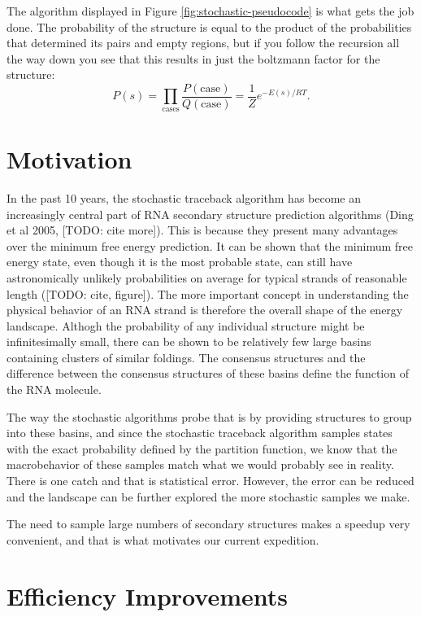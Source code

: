 The algorithm displayed in Figure \ref{fig:stochastic-pseudocode} is
what gets the job done. The probability of the structure is equal to
the product of the probabilities that determined its pairs and empty
regions, but if you follow the recursion all the way down you see that
this results in just the boltzmann factor for the structure:
\begin{equation}
P(s) = \prod_{\text{cases}} \frac{P(\text{case})}{Q(\text{case})} =
\frac{1}{Z} e^{-E(s)/RT}.
\end{equation}

\section{Motivation}

In the past 10 years, the stochastic traceback algorithm has become an
increasingly central part of RNA secondary structure prediction
algorithms (Ding et al 2005, [TODO: cite more]). This is because they
present many advantages over the minimum free energy prediction. It
can be shown that the minimum free energy state, even though it is the
most probable state, can still have astronomically unlikely
probabilities on average for typical strands of reasonable length
([TODO: cite, figure]). The more important concept in understanding
the physical behavior of an RNA strand is therefore the overall shape
of the energy landscape. Althogh the probability of any individual
structure might be infinitesimally small, there can be shown to be
relatively few large basins containing clusters of similar foldings.
The consensus structures and the difference between the consensus
structures of these basins define the function of the RNA molecule.

The way the stochastic algorithms probe that is by providing
structures to group into these basins, and since the stochastic
traceback algorithm samples states with the exact probability defined
by the partition function, we know that the macrobehavior of these
samples match what we would probably see in reality. There is one
catch and that is statistical error. However, the error can be reduced
and the landscape can be further explored the more stochastic samples
we make.

The need to sample large numbers of secondary structures makes a
speedup very convenient, and that is what motivates our current
expedition.

\section{Efficiency Improvements}

